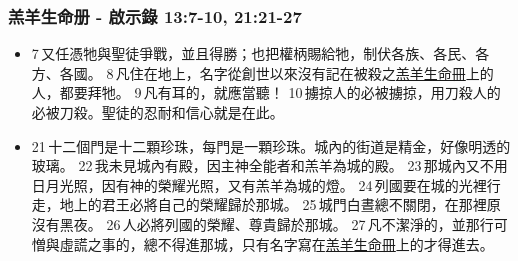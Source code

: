 \subsubsection{羔羊生命册 - 啟示錄 13:7-10, 21:21-27}
\begin{itemize} 
\itemsep-.25em
\item 7 又任憑牠與聖徒爭戰，並且得勝；也把權柄賜給牠，制伏各族、各民、各方、各國。 8 凡住在地上，名字從創世以來沒有記在被殺之\underline{羔羊生命冊}上的人，都要拜牠。 9 凡有耳的，就應當聽！ 10 擄掠人的必被擄掠，用刀殺人的必被刀殺。聖徒的忍耐和信心就是在此。
\item 21 十二個門是十二顆珍珠，每門是一顆珍珠。城內的街道是精金，好像明透的玻璃。 22 我未見城內有殿，因主神全能者和羔羊為城的殿。 23 那城內又不用日月光照，因有神的榮耀光照，又有羔羊為城的燈。 24 列國要在城的光裡行走，地上的君王必將自己的榮耀歸於那城。 25 城門白晝總不關閉，在那裡原沒有黑夜。 26 人必將列國的榮耀、尊貴歸於那城。 27 凡不潔淨的，並那行可憎與虛謊之事的，總不得進那城，只有名字寫在\underline{羔羊生命冊}上的才得進去。
\end{itemize} 

